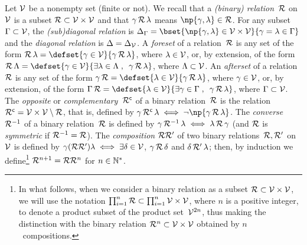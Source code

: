 \documentclass[12pt]{article}
\begin{document}
Let ${\cal V}$ be a nonempty set (finite or not). 
We recall that a \emph{(binary) relation}~$\mathcal{R}$ on~${\cal V}$ is
a subset $\mathcal{R} \subset {\cal V}\times{\cal V} $ and that 
\( \gamma\, \mathcal{R}\, \lambda \) means 
\( \np{\bgent,\cgent} \in \relation \).
For any subset \( \Gamma \subset {\cal V} \), 
the \emph{(sub)diagonal relation} is \( \Delta_{\Bgent} = \bset{ \np{\bgent,\cgent} \in \AGENT\times\AGENT }%
{ \bgent=\cgent \in \Bgent } \)
and the \emph{diagonal relation} is \( \Delta=\Delta_{{\cal V}} \).
%
A \emph{foreset} of a relation~$\mathcal{R}$ is
any set of the form \( \relation \, \cgent = 
\defset{ \bgent \in  \AGENT }{ \bgent\, \relation \, \cgent } \),
where \( \lambda \in {\cal V} \), 
or, by extension, of the form \( \relation \, \Cgent = 
\defset{ \bgent \in  \AGENT }{ \exists \cgent \in \Cgent \eqsepv \bgent\,
  \relation \, \cgent } \), where \( \Lambda \subset {\cal V} \).
%
An \emph{afterset} of a relation~$\mathcal{R}$ is
any set of the form \( \bgent \, \relation = 
\defset{ \cgent \in  \AGENT }{ \bgent\, \relation \, \cgent } \),
where \( \gamma \in {\cal V} \), 
or, by extension, of the form \( \Bgent \, \relation = 
\defset{ \cgent \in  \AGENT }{ \exists \bgent \in \Bgent \eqsepv \bgent\,
  \relation \, \cgent } \), where \( \Gamma \subset {\cal V} \).
%
The \emph{opposite} or \emph{complementary~$\mathcal{R}^{\mathsf{c}}$} of a binary
relation~$\mathcal{R}$ is the relation~$\mathcal{R}^{\mathsf{c}}={\cal V}\times{\cal V}\setminus\mathcal{R}$,
that is, defined by \( \bgent\, \relation^{\mathsf{c}} \, \cgent \iff 
\neg \np{ \bgent\, \relation \, \cgent } \).
The \emph{converse~$\mathcal{R}^{-1}$} of a binary relation~$\mathcal{R}$ is
defined by \( \gamma\, \mathcal{R}^{-1} \, \lambda \iff \lambda\, \mathcal{R} \, \gamma
\) (and $\mathcal{R}$ is  \emph{symmetric} if \( \mathcal{R}^{-1}=\mathcal{R} \)).
The \emph{composition}
$\mathcal{R}\mathcal{R}'$ of two
binary relations~$\mathcal{R}, \mathcal{R}'$ on~${\cal V}$ is defined by
\( \gamma (\mathcal{R}\mathcal{R}') \lambda \iff
\exists \delta \in  {\cal V} \), \( \gamma\, \mathcal{R} \, \delta \)
and \( \delta\, \mathcal{R}' \, \lambda \);
then, by induction we define\footnote{%
  In what follows, when we consider a binary relation
  as a subset $\mathcal{R} \subset {\cal V}\times{\cal V} $, we will use the notation
  \( \prod_{i=1}^{n} \mathcal{R} \subset \prod_{i=1}^{n} {\cal V}\times{\cal V}\), where $n$ is
  a positive integer, to
  denote a product subset of the product set~\( {\cal V}^{2n} \),
  thus making the distinction with the binary relation
  $\mathcal{R}^{n} \subset {\cal V}\times{\cal V} $ obtained by $n$~compositions.}
\( \mathcal{R}^{n+1}=\mathcal{R}\mathcal{R}^{n} \) for \( n \in {\mathbb N}^* \). 
\end{document}
